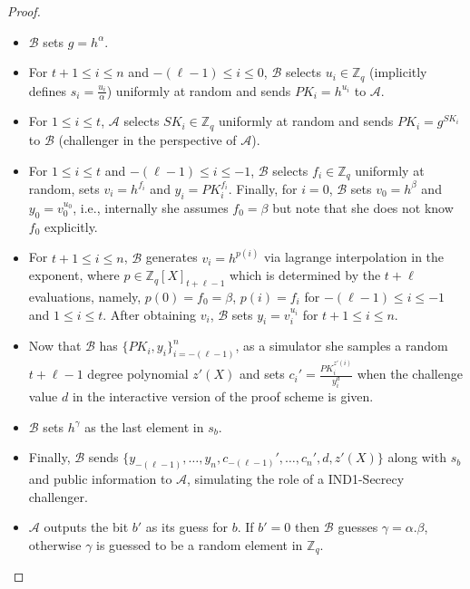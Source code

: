 \begin{proof}
\begin{itemize}
      \begin{itemize}
        \item $\mathcal{B}$ sets $g=h^\alpha$.
        \item For $t+1\leq i\leq n$ and $-(\ell-1)\leq i\leq 0$, $\mathcal{B}$ selects $u_i\in\mathbb{Z}_q$ (implicitly 
          defines $s_i=\frac{u_i}{\alpha}$) uniformly at random and sends 
          $PK_i=h^{u_i}$ to $\mathcal{A}$.
        \item For $1\leq i\leq t$, $\mathcal{A}$ selects $SK_i\in\mathbb{Z}_q$ uniformly at 
          random and sends $PK_i=g^{SK_i}$ to $\mathcal{B}$ (challenger in the perspective of $\mathcal{A}$).
        \item For $1\leq i\leq t$ and $-(\ell-1)\leq i\leq -1$, $\mathcal{B}$ selects $f_i\in\mathbb{Z}_q$ uniformly at random, 
          sets $v_i=h^{f_i}$ and $y_i=PK_i^{f_i}$. Finally, for $i=0$, $\mathcal{B}$ sets $v_0=h^{\beta}$ and 
          $y_0=v_0^{u_0}$, i.e., internally 
          she assumes $f_0=\beta$ but note that she does not know $f_0$ explicitly.\par
        \item For $t+1\leq i\leq n$, $\mathcal{B}$ generates $v_i=h^{p(i)}$ via lagrange interpolation 
          in the exponent, where $p\in\mathbb{Z}_q[X]_{t+\ell-1}$ which is determined by the 
          $t+\ell$ evaluations, namely, $p(0)=f_0=\beta$, $p(i)=f_i$ for 
          $-(\ell-1)\leq i\leq -1$ and $1\leq i\leq t$. After obtaining $v_i$, 
          $\mathcal{B}$ sets $y_i=v_i^{u_i}$ for $t+1\leq i\leq n$.
        \item Now that $\mathcal{B}$ has $\{PK_i,y_i\}_{i=-(\ell-1)}^n$, as a simulator she samples a 
          random $t+\ell-1$ degree polynomial $z'(X)$ and sets $c_i'=\frac{PK_i^{z'(i)}}{y_i^d}$ 
          when the challenge value $d$ in the interactive version of the proof scheme is given.
        \item $\mathcal{B}$ sets $h^\gamma$ as the last element in $s_b$.
        \item Finally, $\mathcal{B}$ sends $\{y_{-(\ell-1)},\dots,y_n,c_{-(\ell-1)}',\dots,c_n',d,z'(X)\}$ 
          along with $s_b$ and public information to $\mathcal{A}$, simulating the role of a 
          IND1-Secrecy challenger.
        \item $\mathcal{A}$ outputs the bit $b'$ as its guess for $b$. If $b'=0$ then 
          $\mathcal{B}$ guesses $\gamma=\alpha.\beta$, otherwise $\gamma$ is guessed to be 
          a random element in $\mathbb{Z}_q$.
      \end{itemize}

  \end{itemize}
\end{proof}
\vspace{30em}

